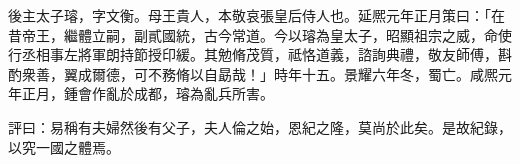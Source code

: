 \begin{pinyinscope}
 
 
 後主太子璿，字文衡。母王貴人，本敬哀張皇后侍人也。延熈元年正月策曰：「在昔帝王，繼體立嗣，副貳國統，古今常道。今以璿為皇太子，昭顯祖宗之威，命使行丞相事左將軍朗持節授印緩。其勉脩茂質，祗恪道義，諮詢典禮，敬友師傅，斟酌衆善，翼成爾德，可不務脩以自勗哉！」時年十五。景耀六年冬，蜀亡。咸熈元年正月，鍾會作亂於成都，璿為亂兵所害。
 
 
 
 
 
 
 評曰：易稱有夫婦然後有父子，夫人倫之始，恩紀之隆，莫尚於此矣。是故紀錄，以究一國之體焉。
 
 
\end{pinyinscope}